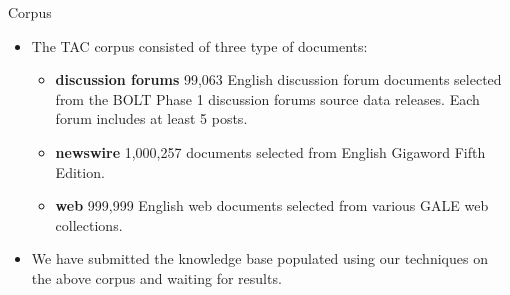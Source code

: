 \documentclass{beamer}
\begin{document}
\begin{frame}{Corpus}
 \begin{itemize}
  \item The TAC corpus consisted of three type of documents: \pause
    \begin{itemize}
	\item \textbf{discussion forums } 99,063 English discussion forum documents selected from the BOLT Phase 1 discussion forums source data releases. Each forum includes at least 5 posts. \pause

	\item \textbf{newswire } 1,000,257 documents selected from English Gigaword Fifth Edition. \pause

	 \item \textbf{web} 999,999 English web documents selected from various GALE web collections. \pause
    \end{itemize}
    
      \item We have submitted the knowledge base populated using our techniques on the above corpus and waiting for results.
 \end{itemize}


 
\end{frame}
\end{document}

